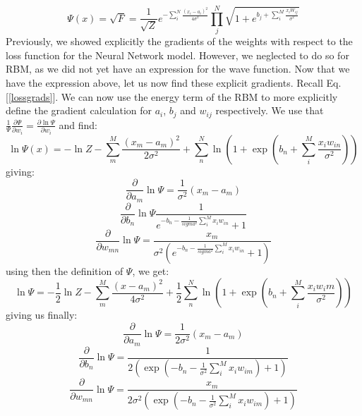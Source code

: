 \documentclass[12pt]{article}
\begin{document}
{\begin{equation*}
\end{equation*}
\begin{equation}
    \Psi(x) = \sqrt{F} = \frac{1}{\sqrt{Z}} e^{-\sum_i^N \frac{(x_i - a_i)^2}{4\sigma^2}} \prod_j^N \sqrt{1 + e^{b_j + \sum_i^M \frac{x_i W_{ij}}{\sigma^2}}}
\end{equation}
Previously, we showed explicitly the gradients of the weights with respect to the loss function for the Neural Network model. However, we neglected to do so for RBM, as we did not yet have an expression for the wave function. Now that we have the expression above, let us now find these explicit gradients. \newline
Recall Eq. [\ref{lossgrads}]. We can now use the energy term of the RBM to more explicitly define the gradient calculation for $a_i$, $b_j$ and $w_{ij}$ respectively.
\newline
We use that $\frac{1}{\Psi} \frac{\partial \Psi}{\partial w_i} = \frac{\partial \ln \Psi}{\partial w_i}$ and find:
\begin{equation*}
    \ln \Psi (x) = - \ln Z - \sum_m^M \frac{(x_m - a_m)^2}{2 \sigma^2} + \sum_n^N \ln \left(1 + \exp\left(b_n + \sum_i^M \frac{x_i w_{in}}{\sigma^2}\right)\right)
\end{equation*}
giving:
\begin{equation*}
    \frac{\partial}{\partial a_m} \ln \Psi = \frac{1}{\sigma^2} (x_m - a_m)
\end{equation*}
\begin{equation*}
    \frac{\partial}{\partial b_n} \ln \Psi \frac{1}{e^{-b_n - \frac{1}{sigma^2}\sum_i^M x_i w_{in}} + 1}
\end{equation*}
\begin{equation*}
    \frac{\partial}{\partial w_{mn}} \ln \Psi = \frac{x_m}{\sigma^2\left(e^{-b_n - \frac{1}{sigma^2}\sum_i^M x_i w_{in}} + 1\right)}
\end{equation*}
using then the definition of $\Psi$, we get:
\begin{equation*}
    \ln \Psi = - \frac{1}{2} \ln Z - \sum_m^M \frac{(x - a_m)^2}{4\sigma^2} + \frac{1}{2} \sum_n^N \ln \left( 1 + \exp\left(b_n + \sum_i^M \frac{x_i w_im}{\sigma^2}\right)\right)
\end{equation*}
giving us finally:
\begin{equation}
    \frac{\partial}{\partial a_m} \ln \Psi = \frac{1}{2 \sigma^2} (x_m - a_m)
\end{equation}
\begin{equation}
    \frac{\partial}{\partial b_n} \ln \Psi = \frac{1}{2\left(\exp\left(-b_n - \frac{1}{\sigma^2}\sum_i^M x_i w_{im}\right) + 1 \right)}
\end{equation}
\begin{equation}
    \frac{\partial}{\partial w_{mn}} \ln \Psi =  \frac{x_m}{2\sigma^2\left(\exp\left(-b_n - \frac{1}{\sigma^2}\sum_i^M x_i w_{im}\right) + 1 \right)}
\end{equation}
}
\end{document}
